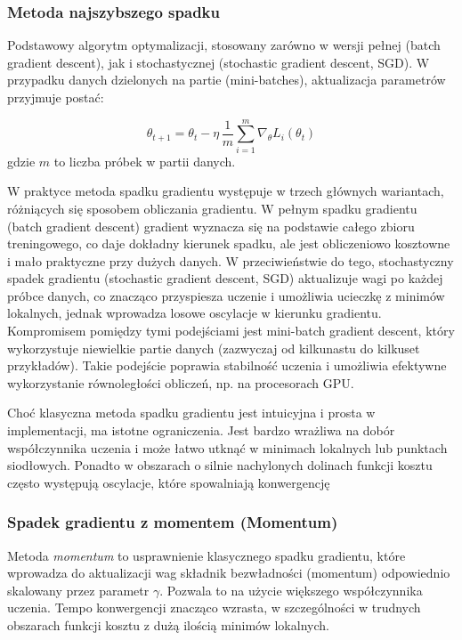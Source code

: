 \subsubsection*{Metoda najszybszego spadku}

Podstawowy algorytm optymalizacji, stosowany zarówno w wersji pełnej (batch gradient descent), jak i stochastycznej (stochastic gradient descent, SGD).
W przypadku danych dzielonych na partie (mini-batches), aktualizacja parametrów przyjmuje postać:

\[
\theta_{t+1} = \theta_t - \eta \, \frac{1}{m} \sum_{i=1}^{m} \nabla_\theta L_i(\theta_t)
\]
gdzie $m$ to liczba próbek w partii danych.

W praktyce metoda spadku gradientu występuje w trzech głównych wariantach, różniących się sposobem obliczania gradientu. W pełnym spadku gradientu (batch gradient descent) gradient wyznacza się na podstawie całego zbioru treningowego, co daje dokładny kierunek spadku, ale jest obliczeniowo kosztowne i mało praktyczne przy dużych danych. W przeciwieństwie do tego, stochastyczny spadek gradientu (stochastic gradient descent, SGD) aktualizuje wagi po każdej próbce danych, co znacząco przyspiesza uczenie i umożliwia ucieczkę z minimów lokalnych, jednak wprowadza losowe oscylacje w kierunku gradientu. Kompromisem pomiędzy tymi podejściami jest mini-batch gradient descent, który wykorzystuje niewielkie partie danych (zazwyczaj od kilkunastu do kilkuset przykładów). Takie podejście poprawia stabilność uczenia i umożliwia efektywne wykorzystanie równoległości obliczeń, np. na procesorach GPU.

Choć klasyczna metoda spadku gradientu jest intuicyjna i prosta w implementacji, ma istotne ograniczenia. Jest bardzo wrażliwa na dobór współczynnika uczenia i może łatwo utknąć w minimach lokalnych lub punktach siodłowych. Ponadto w obszarach o silnie nachylonych dolinach funkcji kosztu często występują oscylacje, które spowalniają konwergencję

\subsubsection*{Spadek gradientu z momentem (Momentum)}

Metoda \textit{momentum} to usprawnienie klasycznego spadku gradientu, które wprowadza do aktualizacji wag składnik bezwładności (momentum) odpowiednio skalowany przez parametr $\gamma$. Pozwala to na użycie większego współczynnika uczenia. Tempo konwergencji znacząco wzrasta, w szczególności w trudnych obszarach funkcji kosztu z dużą ilością minimów lokalnych.

